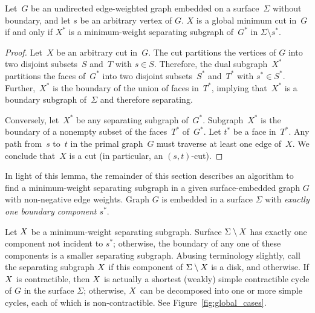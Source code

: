 \documentclass[letterpaper,review]{siamart190516}
\def\Cut{X}
\begin{document}
{\begin{lemma}
\label{lem:mincut-z2}
Let~$G$ be an undirected edge-weighted graph embedded on a surface~$\Sigma$ without boundary, and
let $s$ be an arbitrary vertex of $G$.
$\Cut$ is a global minimum cut in~$G$ if and only if $\Cut^*$ is a minimum-weight separating subgraph
of~$G^*$ in $\Sigma \setminus s^*$.
\end{lemma}

\begin{proof}
  Let~$\Cut$ be an arbitrary cut in~$G$.  The cut partitions the vertices of $G$
  into two disjoint subsets~$S$ and~$T$ with $s \in S$.
  Therefore, the dual subgraph~$\Cut^*$
  partitions the faces of~$G^*$ into two disjoint subsets~$S^*$ and~$T^*$ with $s^* \in S^*$.
  Further,~$\Cut^*$ is the boundary of the union of faces in~$T^*$, implying
  that~$\Cut^*$ is a boundary subgraph of~$\Sigma$ and therefore separating.

  Conversely, let~$\Cut^*$ be any separating subgraph of~$G^*$.
  Subgraph~$\Cut^*$ is the boundary of a nonempty subset of the faces~$T^*$
  of~$G^*$.
  Let $t^*$ be a face in~$T^*$.
  Any path from~$s$ to~$t$ in the primal
  graph~$G$ must traverse at least one edge of~$\Cut$.  We conclude that~$\Cut$ is
  a cut (in particular, an $(s,t)$-cut).
\end{proof}

In light of this lemma, the remainder of this section describes an algorithm to find a minimum-weight separating subgraph in a given surface-embedded graph $G$ with non-negative edge weights.
Graph $G$ is embedded in a surface $\Sigma$ with \emph{exactly one boundary component $s^*$}.

Let $X$ be a minimum-weight separating subgraph.
Surface $\Sigma \setminus X$ has exactly one component not incident to $s^*$; otherwise, the
boundary of any one of these components is a smaller separating subgraph.
Abusing terminology slightly,
call the separating subgraph $X$  if this component of $\Sigma \setminus
X$ is a disk, and  otherwise.  If $X$ is contractible, then
$X$ is actually a shortest (weakly) simple contractible cycle of $G$ in the surface $\Sigma$; otherwise, $X$ can be decomposed into one or more simple cycles, each of which is non-contractible.  See Figure~\ref{fig:global_cases}.


}
\end{document}
